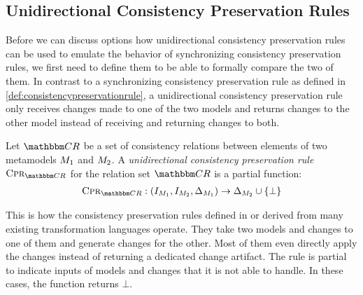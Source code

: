 \subsection{Unidirectional Consistency Preservation Rules}

Before we can discuss options how unidirectional consistency preservation rules can be used to emulate the behavior of synchronizing consistency preservation rules, we first need to define them to be able to formally compare the two of them.
In contrast to a synchronizing consistency preservation rule as defined in \autoref{def:consistencypreservationrule}, a unidirectional consistency preservation rule only receives changes made to one of the two models and returns changes to the other model instead of receiving and returning changes to both.

\begin{definition}
    \label{def:unidirectionalconsistencypreservationrule}
    Let $\consistencyrelationset{CR}$ be a set of consistency relations between elements of two metamodels $\metamodel{M}{1}$ and $\metamodel{M}{2}$.
    A \emph{unidirectional consistency preservation rule} $\consistencypreservationrule{\consistencyrelationset{CR}}$ for the relation set $\consistencyrelationset{CR}$ is a partial function:
    \begin{align*}
        \consistencypreservationrule{\consistencyrelationset{CR}} : (\metamodelinstanceset{M}{1}, \metamodelinstanceset{M}{2}, \changeuniverse{\metamodel{M}{1}}) \rightarrow \changeuniverse{\metamodel{M}{2}} \cup \setted{\bot}
    \end{align*}
\end{definition}

This is how the consistency preservation rules defined in or derived from many existing transformation languages operate.
They take two models and changes to one of them and generate changes for the other.
Most of them even directly apply the changes instead of returning a dedicated change artifact.
The rule is partial to indicate inputs of models and changes that it is not able to handle. In these cases, the function returns $\bot$.

